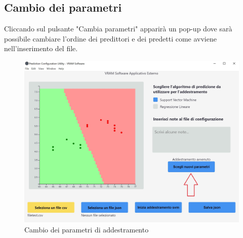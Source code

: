 	\subsection{Cambio dei parametri}
	Cliccando sul pulsante "Cambia parametri" apparirà un pop-up dove sarà possibile cambiare l'ordine dei predittori e dei predetti come avviene nell'inserimento del file.
	\begin{figure}[H] 	
		\begin{center}
			\includegraphics[width=\linewidth]{img/4-1.jpg}
		\end{center}
		\caption{Cambio dei parametri di addestramento}	
	\end{figure}
